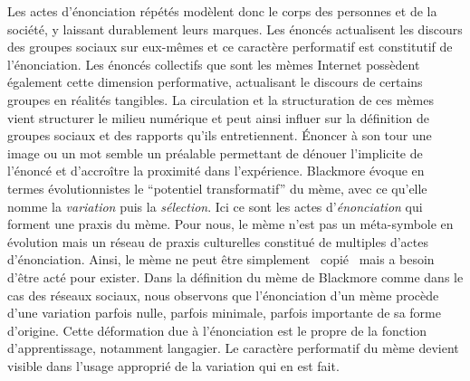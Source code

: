 Les actes d{\textquoteright}énonciation répétés modèlent donc le corps des personnes et de la société, y laissant durablement leurs marques. Les énoncés actualisent les discours des groupes sociaux sur eux-mêmes \citep{Butler1993} et ce caractère performatif est constitutif de l{\textquoteright}énonciation. Les énoncés collectifs que sont les mèmes Internet possèdent également cette dimension performative, actualisant le discours de certains groupes en réalités tangibles. La circulation et la structuration de ces mèmes vient structurer le milieu numérique et peut ainsi influer sur la définition de groupes sociaux et des rapports qu{\textquoteright}ils entretiennent. \'Enoncer à son tour une image ou un mot semble un préalable permettant de dénouer l{\textquoteright}implicite de l{\textquoteright}énoncé et d'accroître la proximité dans l{\textquoteright}expérience. Blackmore évoque en termes évolutionnistes le {\textquotedblleft}potentiel transformatif{\textquotedblright} du mème, avec ce qu{\textquoteright}elle nomme la \textit{variation} puis la \textit{sélection}. Ici ce sont les actes d{\textquoteright}\textit{énonciation} qui forment une praxis du mème. Pour nous, le mème n{\textquoteright}est pas un méta-symbole en évolution mais un réseau de praxis culturelles constitué de multiples d{\textquoteright}actes d{\textquoteright}énonciation. Ainsi, le mème ne peut être simplement {\guillemotleft}~copié~{\guillemotright} mais a besoin d{\textquoteright}être acté pour exister. Dans la définition du mème de Blackmore comme dans le cas des réseaux sociaux, nous observons que l{\textquoteright}énonciation d{\textquoteright}un mème procède d{\textquoteright}une variation parfois nulle, parfois minimale, parfois importante de sa forme d{\textquoteright}origine. Cette déformation due à l{\textquoteright}énonciation est le propre de la fonction d{\textquoteright}apprentissage, notamment langagier. Le caractère performatif du mème devient visible dans l{\textquoteright}usage approprié de la variation qui en est fait. 


